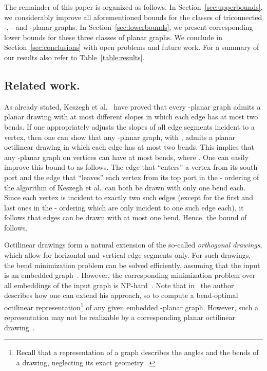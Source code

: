 \documentclass[a4paper,twoside,11pt]{article}
\begin{document}
The remainder of this paper is organized as follows. In
Section~\ref{sec:upperbounds}, we considerably improve all
aforementioned bounds for the classes of triconnected -, - and
-planar graphs. In Section~\ref{sec:lowerbounds}, we present
corresponding lower bounds for these three classes of planar graphs.
We conclude in Section~\ref{sec:conclusions} with open problems and
future work. For a summary of our results also refer to
Table~\ref{table:results}.


\subsection{Related work.}
\label{sec:relatedwork}
As already stated, Keszegh et al.~\cite{KPP13} have proved that
every -planar graph admits a planar drawing with at most
 different slopes in which each edge has at
most two bends. If one appropriately adjusts the slopes of all edge
segments incident to a vertex, then one can show that any -planar
graph, with , admits a planar octilinear drawing in
which each edge has at most two bends. This implies that any
-planar graph on  vertices can have at most  bends,
where . One can easily improve this bound to
 as follows. The edge that ``enters'' a vertex from its south
port and the edge that ``leaves'' each vertex from its top port in
the - ordering of the algorithm of Keszegh et al.~can both be
drawn with only one bend each. Since each vertex is incident to
exactly two such edges (except for the first and last ones in the
- ordering which are only incident to one such edge each), it
follows that  edges can be drawn with at most one bend. Hence,
the bound of  follows.

Octilinear drawings form a natural extension of the so-called
\emph{orthogonal drawings}, which allow for horizontal and vertical
edge segments only. For such drawings, the bend minimization problem
can be solved efficiently, assuming that the input is an embedded
graph~\cite{Tamassia87}. However, the corresponding minimization
problem over all embeddings of the input graph is
NP-hard~\cite{GT01}. Note that in~\cite{Tamassia87} the author
describes how one can extend his approach, so to compute a
bend-optimal octilinear representation\footnote{Recall that a
representation of a graph describes the angles and the bends of a
drawing, neglecting its exact geometry~\cite{Tamassia87}.} of any
given embedded -planar graph. However, such a representation may
not be realizable by a corresponding planar octilinear
drawing~\cite{BT04}.
\end{document}
